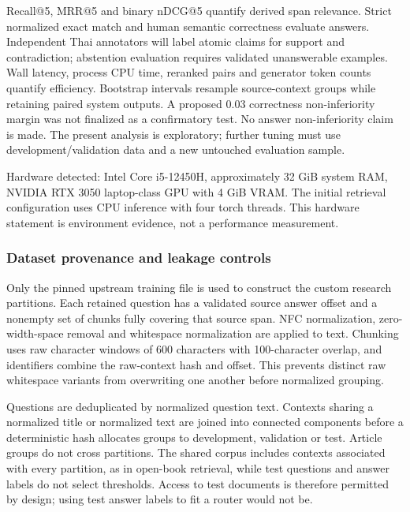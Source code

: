 \documentclass[10pt,a4paper]{article}
\begin{document}
Recall@5, MRR@5 and binary nDCG@5 quantify derived span relevance.
Strict normalized exact match and human semantic correctness evaluate
answers. Independent Thai annotators will label atomic claims for
support and contradiction; abstention evaluation requires validated
unanswerable examples. Wall latency, process CPU time, reranked pairs
and generator token counts quantify efficiency. Bootstrap intervals
resample source-context groups while retaining paired system outputs. A
proposed 0.03 correctness non-inferiority margin was not finalized as a
confirmatory test. No answer non-inferiority claim is made. The present
analysis is exploratory; further tuning must use development/validation
data and a new untouched evaluation sample.

Hardware detected: Intel Core i5-12450H, approximately 32 GiB system
RAM, NVIDIA RTX 3050 laptop-class GPU with 4 GiB VRAM. The initial
retrieval configuration uses CPU inference with four torch threads. This
hardware statement is environment evidence, not a performance
measurement.

\hypertarget{dataset-provenance-and-leakage-controls}{%
\subsubsection{Dataset provenance and leakage
controls}\label{dataset-provenance-and-leakage-controls}}

Only the pinned upstream training file is used to construct the custom
research partitions. Each retained question has a validated source
answer offset and a nonempty set of chunks fully covering that source
span. NFC normalization, zero-width-space removal and whitespace
normalization are applied to text. Chunking uses raw character windows
of 600 characters with 100-character overlap, and identifiers combine
the raw-context hash and offset. This prevents distinct raw whitespace
variants from overwriting one another before normalized grouping.

Questions are deduplicated by normalized question text. Contexts sharing
a normalized title or normalized text are joined into connected
components before a deterministic hash allocates groups to development,
validation or test. Article groups do not cross partitions. The shared
corpus includes contexts associated with every partition, as in
open-book retrieval, while test questions and answer labels do not
select thresholds. Access to test documents is therefore permitted by
design; using test answer labels to fit a router would not be.
\end{document}
